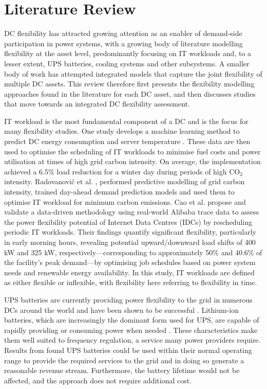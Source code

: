 \documentclass[lettersize,journal]{IEEEtran}
\newcommand{\rev}[1]{#1}
\begin{document}
\section{Literature Review}

\rev{DC flexibility has attracted growing attention as an enabler of demand-side participation in power systems, with a growing body of literature modelling flexibility at the asset level, predominantly focusing on IT workloads and, to a lesser extent, UPS batteries, cooling systems and other subsystems. A smaller body of work has attempted integrated models that capture the joint flexibility of multiple DC assets. This review therefore first presents the flexibility modelling approaches found in the literature for each DC asset, and then discusses studies that move towards an integrated DC flexibility assessment.}

IT workload is the most fundamental component of a DC and is the focus for many flexibility studies. One study develops a machine learning method to predict DC energy consumption and server temperature \cite{Misaghian2023TIA}. These data are then used to optimise the scheduling of IT workloads to minimise fuel costs and power utilisation at times of high grid carbon intensity. On average, the implementation achieved a 6.5\% load reduction for a winter day during periods of high CO$_2$ intensity. Radovanović et al. \cite{radovanovic2022carbon}, performed predictive modelling of grid carbon intensity, trained day-ahead demand prediction models and used them to optimise IT workload for minimum carbon emissions.
Cao et al. \cite{Cao2022ApEn} propose and validate a data-driven methodology using real-world Alibaba trace data to assess the power flexibility potential of Internet Data Centres (IDCs) by rescheduling periodic IT workloads. Their findings quantify significant flexibility, particularly in early morning hours, revealing potential upward/downward load shifts of 400 kW and 325 kW, respectively---corresponding to approximately 50\% and 40.6\% of the facility's peak demand---by optimising job schedules based on power system needs and renewable energy availability. In this study, IT workloads are defined as either flexible or inflexible, with flexibility here referring to flexibility in time.

UPS batteries are currently providing power flexibility to the grid in numerous DCs around the world and have been shown to be successful \cite{alapera2019fast,roach2022microsoft,Anghel_2023}. Lithium-ion batteries, which are increasingly the dominant form used for UPS, are capable of rapidly providing or consuming power when needed \cite{alapera2018data}. These characteristics make them well suited to frequency regulation, a service many power providers require. Results from \cite{alapera2018data} found UPS batteries could be used within their normal operating range to provide the required services to the grid and in doing so generate a reasonable revenue stream. Furthermore, the battery lifetime would not be affected, and the approach does not require additional cost.
\end{document}
